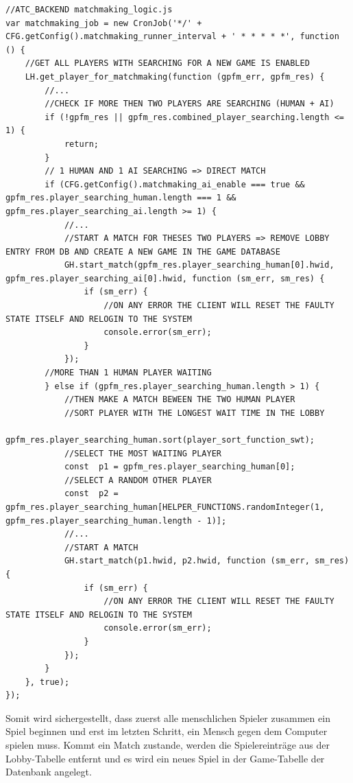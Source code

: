 \begin{lstlisting}
//ATC_BACKEND matchmaking_logic.js
var matchmaking_job = new CronJob('*/' + CFG.getConfig().matchmaking_runner_interval + ' * * * * *', function () {
    //GET ALL PLAYERS WITH SEARCHING FOR A NEW GAME IS ENABLED
    LH.get_player_for_matchmaking(function (gpfm_err, gpfm_res) {
        //...
        //CHECK IF MORE THEN TWO PLAYERS ARE SEARCHING (HUMAN + AI)
        if (!gpfm_res || gpfm_res.combined_player_searching.length <= 1) {
            return;
        }
        // 1 HUMAN AND 1 AI SEARCHING => DIRECT MATCH
        if (CFG.getConfig().matchmaking_ai_enable === true && gpfm_res.player_searching_human.length === 1 && gpfm_res.player_searching_ai.length >= 1) {
            //...
            //START A MATCH FOR THESES TWO PLAYERS => REMOVE LOBBY ENTRY FROM DB AND CREATE A NEW GAME IN THE GAME DATABASE
            GH.start_match(gpfm_res.player_searching_human[0].hwid, gpfm_res.player_searching_ai[0].hwid, function (sm_err, sm_res) {
                if (sm_err) {
                    //ON ANY ERROR THE CLIENT WILL RESET THE FAULTY STATE ITSELF AND RELOGIN TO THE SYSTEM
                    console.error(sm_err);
                }
            });
        //MORE THAN 1 HUMAN PLAYER WAITING
        } else if (gpfm_res.player_searching_human.length > 1) {
            //THEN MAKE A MATCH BEWEEN THE TWO HUMAN PLAYER
            //SORT PLAYER WITH THE LONGEST WAIT TIME IN THE LOBBY
            gpfm_res.player_searching_human.sort(player_sort_function_swt);
            //SELECT THE MOST WAITING PLAYER
            const  p1 = gpfm_res.player_searching_human[0];
            //SELECT A RANDOM OTHER PLAYER
            const  p2 = gpfm_res.player_searching_human[HELPER_FUNCTIONS.randomInteger(1, gpfm_res.player_searching_human.length - 1)];
            //...
            //START A MATCH
            GH.start_match(p1.hwid, p2.hwid, function (sm_err, sm_res) {
                if (sm_err) {
                    //ON ANY ERROR THE CLIENT WILL RESET THE FAULTY STATE ITSELF AND RELOGIN TO THE SYSTEM
                    console.error(sm_err);
                }
            });
        }
    }, true);
});
\end{lstlisting}

Somit wird sichergestellt, dass zuerst alle menschlichen Spieler
zusammen ein Spiel beginnen und erst im letzten Schritt, ein Mensch
gegen dem Computer spielen muss. Kommt ein Match zustande, werden die
Spielereinträge aus der Lobby-Tabelle entfernt und es wird ein neues
Spiel in der Game-Tabelle der Datenbank angelegt.

